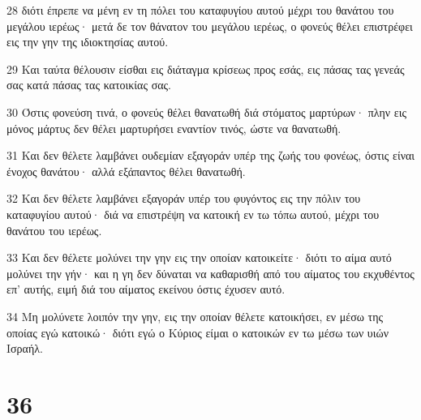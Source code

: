 \par 28 διότι έπρεπε να μένη εν τη πόλει του καταφυγίου αυτού μέχρι του θανάτου του μεγάλου ιερέως· μετά δε τον θάνατον του μεγάλου ιερέως, ο φονεύς θέλει επιστρέφει εις την γην της ιδιοκτησίας αυτού.
\par 29 Και ταύτα θέλουσιν είσθαι εις διάταγμα κρίσεως προς εσάς, εις πάσας τας γενεάς σας κατά πάσας τας κατοικίας σας.
\par 30 Όστις φονεύση τινά, ο φονεύς θέλει θανατωθή διά στόματος μαρτύρων· πλην εις μόνος μάρτυς δεν θέλει μαρτυρήσει εναντίον τινός, ώστε να θανατωθή.
\par 31 Και δεν θέλετε λαμβάνει ουδεμίαν εξαγοράν υπέρ της ζωής του φονέως, όστις είναι ένοχος θανάτου· αλλά εξάπαντος θέλει θανατωθή.
\par 32 Και δεν θέλετε λαμβάνει εξαγοράν υπέρ του φυγόντος εις την πόλιν του καταφυγίου αυτού· διά να επιστρέψη να κατοική εν τω τόπω αυτού, μέχρι του θανάτου του ιερέως.
\par 33 Και δεν θέλετε μολύνει την γην εις την οποίαν κατοικείτε· διότι το αίμα αυτό μολύνει την γήν· και η γη δεν δύναται να καθαρισθή από του αίματος του εκχυθέντος επ' αυτής, ειμή διά του αίματος εκείνου όστις έχυσεν αυτό.
\par 34 Μη μολύνετε λοιπόν την γην, εις την οποίαν θέλετε κατοικήσει, εν μέσω της οποίας εγώ κατοικώ· διότι εγώ ο Κύριος είμαι ο κατοικών εν τω μέσω των υιών Ισραήλ.

\chapter{36}

